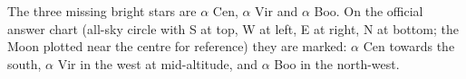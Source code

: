 The three missing bright stars are $\alpha$ Cen, $\alpha$ Vir and
$\alpha$ Boo. On the official answer chart (all-sky circle with S at top,
W at left, E at right, N at bottom; the Moon plotted near the centre for
reference) they are marked: $\alpha$ Cen towards the south, $\alpha$ Vir
in the west at mid-altitude, and $\alpha$ Boo in the north-west.

